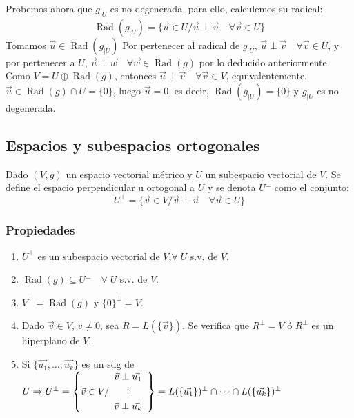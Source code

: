 \documentclass[x11names,table]{report}
\DeclareMathOperator{\rad}{Rad}
\begin{document}
\begin{enumerate}
Probemos ahora que $g_{|U}$ es no degenerada, para ello, calculemos su radical:
\[\rad(g_{|U})=\{\vec{u}\in U / \vec{u}\perp\vec{v}\quad\forall\vec{v}\in U\}\]
Tomamos $\vec{u}\in\rad(g_{|U})$ Por pertenecer al radical de $g_{|U}$, $\vec{u}\perp\vec{v}\quad\forall\vec{v}\in U$, y por pertenecer a $U$, $\vec{u}\perp\vec{w}\quad\forall\vec{w}\in\rad(g)$ por lo deducido anteriormente. Como $V=U\oplus\rad(g)$, entonces $\vec{u}\perp\vec{v}\quad\forall\vec{v}\in V$, equivalentemente,\linebreak $\vec{u}\in\rad(g)\cap U=\{0\}$, luego $\vec{u}=0$, es decir, $\rad(g_{|U})=\{0\}$ y $g_{|U}$ es no degenerada.
\end{enumerate}

\subsection{Espacios y subespacios ortogonales}
Dado $(V,g)$ un espacio vectorial métrico y $U$ un subespacio vectorial de $V$. Se define el espacio perpendicular u ortogonal a $U$ y se denota $U^\perp$ como el conjunto:
\[U^\perp=\{\vec{v}\in V/\vec{v}\perp\vec{u}\quad\forall\vec{u}\in U\}\]

\subsubsection{Propiedades}
\begin{enumerate}
\item $U^\perp$ es un subespacio vectorial de $V$,\quad$\forall\; U$ s.v. de $V$.
\item $\rad(g)\subseteq U^\perp\quad\forall\; U$ s.v. de $V$.
\item $V^\perp=\rad(g)$ y $\{0\}^\perp=V$.
\item Dado $\vec{v}\in V$, $v\not=0$, sea $R=L(\{\vec{v}\})$. Se verifica que $R^\perp=V$ ó $R^\perp$ es un hiperplano de $V$.
\item Si $\{\vec{u_1},\dots,\vec{u_k}\}$ es un sdg de $U\Rightarrow U^\perp=\left\lbrace\vec{v}\in V/\begin{array}{c}
\vec{v}\perp\vec{u_1}\\ \vdots \\ \vec{v}\perp\vec{u_k}
\end{array}\right\rbrace=\linebreak L(\{\vec{u_1}\})^\perp\cap\cdots\cap L(\{\vec{u_k}\})^\perp$
\end{enumerate}
\end{document}

